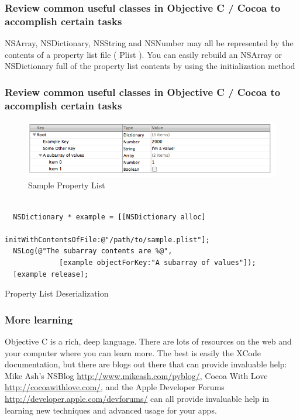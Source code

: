 \documentclass[10pt]{beamer}
\begin{document}
\begin{frame}[fragile]
  \frametitle{Review common useful classes in Objective C / Cocoa to accomplish certain tasks}
  NSArray, NSDictionary, NSString and NSNumber may all be represented by the contents of a property list file ( Plist ).  You can easily rebuild an NSArray or NSDictionary full of the property list contents by using the initialization method 

\end{frame}

\begin{frame}[fragile]
  \frametitle{Review common useful classes in Objective C / Cocoa to accomplish certain tasks}
  \begin{figure}[htb]
  \begin{center}

  \includegraphics[scale=0.5]{PListExample1.png}

  \caption{Sample Property List}
  \end{center}
  \end{figure}

\begin{listing}[H]
    \begin{verbatim}

  NSDictionary * example = [[NSDictionary alloc]
                               initWithContentsOfFile:@"/path/to/sample.plist"];
  NSLog(@"The subarray contents are %@",
             [example objectForKey:"A subarray of values"]);
  [example release];

  \end{verbatim}
    \caption{Property List Deserialization}
    \label{listing:24}
  \end{listing}

\end{frame}

    
\begin{frame}[fragile]
  \frametitle{More learning}
  Objective C is a rich, deep language.  There are lots of resources on the web and your computer where you can learn more. The best is easily the XCode documentation, but there are blogs out there that can provide invaluable help: Mike Ash's NSBlog \url{http://www.mikeash.com/pyblog/},  Cocoa With Love \url{http://cocoawithlove.com/}, and the Apple Developer Forums \url{http://developer.apple.com/devforums/} can all provide invaluable help in learning new techniques and advanced usage for your apps.

\end{frame}
\end{document}
